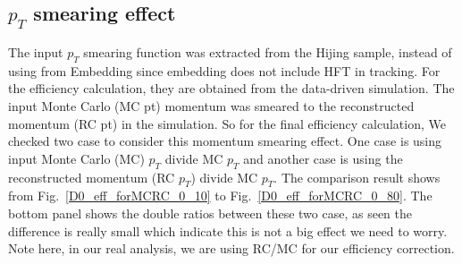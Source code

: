 \begin{figure}
\end{figure}

\subsection{$p_T$ smearing effect} 

The input $p_T$ smearing function was extracted from the Hijing sample, instead of using from Embedding since embedding does not include HFT in tracking. For the efficiency calculation, they are obtained from the data-driven simulation. The input Monte Carlo (MC pt) momentum was smeared to the reconstructed momentum (RC pt) in the simulation. So for the final efficiency calculation, We checked two case to consider this momentum smearing effect. One case is using input Monte Carlo (MC) $p_T$ divide MC $p_T$ and another case is using the reconstructed momentum (RC $p_T$) divide MC $p_T$. The comparison result shows from Fig.~\ref{D0_eff_forMCRC_0_10} to Fig.~\ref{D0_eff_forMCRC_0_80}. The bottom panel shows the double ratios between these two case, as seen the difference is really small which indicate this is not a big effect we need to worry. Note here, in our real analysis, we are using RC/MC for our efficiency correction.

